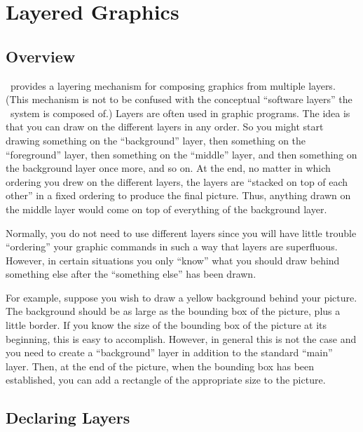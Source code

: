 %
%
%


\section{Layered Graphics}
\label{section-layers}

\subsection{Overview}

\pgfname\ provides a layering mechanism for composing graphics from multiple
layers. (This mechanism is not to be confused with the conceptual ``software
layers'' the \pgfname\ system is composed of.) Layers are often used in graphic
programs. The idea is that you can draw on the different layers in any order.
So you might start drawing something on the ``background'' layer, then
something on the ``foreground'' layer, then something on the ``middle'' layer,
and then something on the background layer once more, and so on. At the end, no
matter in which ordering you drew on the different layers, the layers are
``stacked on top of each other'' in a fixed ordering to produce the final
picture. Thus, anything drawn on the middle layer would come on top of
everything of the background layer.

Normally, you do not need to use different layers since you will have little
trouble ``ordering'' your graphic commands in such a way that layers are
superfluous. However, in certain situations you only ``know'' what you should
draw behind something else after the ``something else'' has been drawn.

For example, suppose you wish to draw a yellow background behind your picture.
The background should be as large as the bounding box of the picture, plus a
little border. If you know the size of the bounding box of the picture at its
beginning, this is easy to accomplish. However, in general this is not the case
and you need to create a ``background'' layer in addition to the standard
``main'' layer. Then, at the end of the picture, when the bounding box has been
established, you can add a rectangle of the appropriate size to the picture.


\subsection{Declaring Layers}

